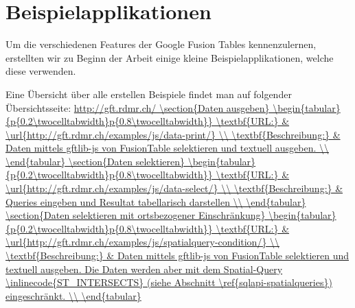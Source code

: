 \chapter{Beispielapplikationen}
\label{beispielapplikationen}
Um die verschiedenen Features der Google Fusion Tables kennenzulernen, erstellten wir zu Beginn der Arbeit einige kleine Beispielapplikationen, welche diese verwenden.

Eine Übersicht über alle erstellen Beispiele findet man auf folgender Übersichtsseite: \url{http://gft.rdmr.ch/

\section{Daten ausgeben}
\begin{tabular}{p{0.2\twocelltabwidth}p{0.8\twocelltabwidth}}
\textbf{URL:} & \url{http://gft.rdmr.ch/examples/js/data-print/} \\ 
\textbf{Beschreibung:} & Daten mittels gftlib-js von FusionTable selektieren und textuell ausgeben. \\ 
\end{tabular} 

\section{Daten selektieren}
\begin{tabular}{p{0.2\twocelltabwidth}p{0.8\twocelltabwidth}}
\textbf{URL:} & \url{http://gft.rdmr.ch/examples/js/data-select/} \\ 
\textbf{Beschreibung:} & Queries eingeben und Resultat tabellarisch darstellen \\ 
\end{tabular} 

\section{Daten selektieren mit ortsbezogener Einschränkung}
\begin{tabular}{p{0.2\twocelltabwidth}p{0.8\twocelltabwidth}}
\textbf{URL:} & \url{http://gft.rdmr.ch/examples/js/spatialquery-condition/} \\ 
\textbf{Beschreibung:} & Daten mittels gftlib-js von FusionTable selektieren und textuell ausgeben. Die Daten werden aber mit dem Spatial-Query \inlinecode{ST\_INTERSECTS} (siehe Abschnitt \ref{sqlapi-spatialqueries}) eingeschränkt. \\ 
\end{tabular} 

}
